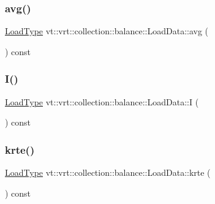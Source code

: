 \subsubsection{\texorpdfstring{avg()}{avg()}}
{\footnotesize\ttfamily \hyperlink{namespacevt_a8fb51741340b87d7aaee0bef60e9896b}{Load\+Type} vt\+::vrt\+::collection\+::balance\+::\+Load\+Data\+::avg (\begin{DoxyParamCaption}{ }\end{DoxyParamCaption}) const\hspace{0.3cm}{\ttfamily [inline]}}

\mbox{\label{structvt_1_1vrt_1_1collection_1_1balance_1_1_load_data_a761a152facd42ef5a69b8ae3bf678ccf}} 
\subsubsection{\texorpdfstring{I()}{I()}}
{\footnotesize\ttfamily \hyperlink{namespacevt_a8fb51741340b87d7aaee0bef60e9896b}{Load\+Type} vt\+::vrt\+::collection\+::balance\+::\+Load\+Data\+::I (\begin{DoxyParamCaption}{ }\end{DoxyParamCaption}) const\hspace{0.3cm}{\ttfamily [inline]}}

\mbox{\label{structvt_1_1vrt_1_1collection_1_1balance_1_1_load_data_aff019f185604c133af25a18047f80a97}} 
\subsubsection{\texorpdfstring{krte()}{krte()}}
{\footnotesize\ttfamily \hyperlink{namespacevt_a8fb51741340b87d7aaee0bef60e9896b}{Load\+Type} vt\+::vrt\+::collection\+::balance\+::\+Load\+Data\+::krte (\begin{DoxyParamCaption}{ }\end{DoxyParamCaption}) const\hspace{0.3cm}{\ttfamily [inline]}}

